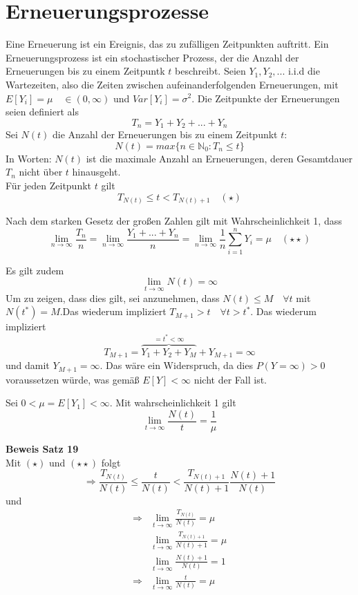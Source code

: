 \documentclass[a4paper,12pt]{article}
\begin{document}
\section{Erneuerungsprozesse}
Eine Erneuerung ist ein Ereignis, das zu zufälligen Zeitpunkten auftritt.
Ein Erneuerungsprozess ist ein stochastischer Prozess, der die Anzahl der Erneuerungen bis
zu einem Zeitpuntk $t$ beschreibt. Seien $Y_1, Y_2, ...$ i.i.d die Wartezeiten, also die
Zeiten zwischen aufeinanderfolgenden Erneuerungen, mit $E[Y_i] = \mu \quad \in (0,\infty)$ und 
$Var[Y_i] = \sigma^2$. Die Zeitpunkte der Erneuerungen seien definiert als
$$
T_n = Y_1 + Y_2 + ... + Y_n
$$
Sei $N(t)$ die Anzahl der Erneuerungen bis zu einem Zeitpunkt $t$:
$$
N(t) = max\{n \in \mathbb{N}_0: T_n \leq t\}
$$
In Worten: $N(t)$ ist die maximale Anzahl an Erneuerungen, deren Gesamtdauer
$T_n$ nicht über $t$ hinausgeht. \\
Für jeden Zeitpunkt $t$ gilt
$$
T_{N(t)} \leq t < T_{N(t)+1} \quad (\star)
$$

Nach dem starken Gesetz der großen Zahlen gilt mit Wahrscheinlichkeit 1, dass
$$
\lim_{n \to \infty}\frac{T_n}{n} = 
\lim_{n \to \infty}\frac{Y_1 + ... + Y_n}{n} =
\lim_{n  \to \infty} \frac{1}{n}\sum_{i=1}^{n}Y_i =
\mu \quad (\star \star)
$$

Es gilt zudem 
$$
\lim_{t \to \infty} N(t) = \infty
$$
Um zu zeigen, dass dies gilt, sei anzunehmen, dass
$N(t) \leq M \quad \forall t$ mit $N(t^*) = M$.Das wiederum impliziert
$T_{M+1}>t \quad \forall t > t^*$. Das wiederum impliziert
$$
T_{M+1} = \overbrace{Y_1 + Y_2 + Y_M}^{= t^* < \infty} + Y_{M+1} = \infty
$$
und damit $Y_{M+1} = \infty$. Das wäre ein Widerspruch, da dies 
$P(Y = \infty) > 0$ voraussetzen würde, was gemäß $E[Y]< \infty$ nicht 
der Fall ist. 

\begin{tcolorbox}[breakable, colframe=green, colback=white, title=Satz 19]
Sei $0 < \mu = E[Y_1] < \infty$. Mit wahrscheinlichkeit 1 gilt
$$
\lim_{t \to \infty}\frac{N(t)}{t} = \frac{1}{\mu}
$$
\end{tcolorbox}
\textbf{Beweis Satz 19}\\
Mit $(\star)$ und $(\star \star)$ folgt
$$
\Rightarrow \frac{T_{N(t)}}{N(t)} \leq \frac{t}{N(t)} < 
\frac{T_{N(t)+1}}{N(t)+1} \frac{N(t)+1}{N(t)} 
$$
und 
\begin{align*}
\Rightarrow & \lim_{t \to \infty} \frac{T_{N(t)}}{N(t)} = \mu \\
& \lim_{t \to \infty} \frac{T_{N(t)+1}}{N(t)+1} = \mu \\
&\lim_{t \to \infty} \frac{N(t)+1}{N(t)} = 1 \\
\Rightarrow & \lim_{t \to \infty} \frac{t}{N(t)} = \mu
\end{align*}
\end{document}
